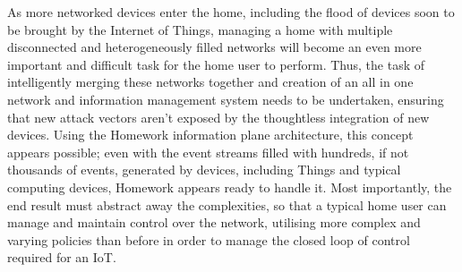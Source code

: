 As more networked devices enter the home, including the flood of devices soon to be brought by the Internet of Things, managing a home with multiple disconnected and heterogeneously filled networks will become an even more important and difficult task for the home user to perform. Thus, the task of intelligently merging these networks together and creation of an all in one network and information management system needs to be undertaken, ensuring that new attack vectors aren't exposed by the thoughtless integration of new devices. Using the Homework information plane architecture, this concept appears possible; even with the event streams filled with hundreds, if not thousands of events, generated by devices, including Things and typical computing devices, Homework appears ready to handle it\cite{DEBSChallenge}. Most importantly, the end result must abstract away the complexities, so that a typical home user can manage and maintain control over the network, utilising more complex and varying policies than before in order to manage the closed loop of control required for an IoT.

